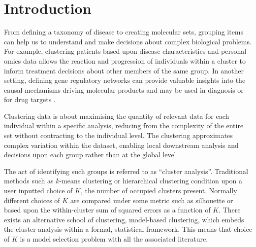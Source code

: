 \documentclass{bioinfo}
\begin{document}
\section{Introduction}

From defining a taxonomy of disease to creating molecular sets, grouping items can help us to understand and make decisions about complex biological problems. For example, clustering patients based upon disease characteristics and personal omics data allows the reaction and progression of individuals within a cluster to inform treatment decisions about other members of the same group. In another setting, defining gene regulatory networks can provide valuable insights into the causal mechanisms driving molecular products and may be used in diagnosis or for drug targets \citep{emmert2014gene}. 

Clustering data is about maximising the quantity of relevant data for each individual within a specific analysis, reducing from the complexity of the entire set without contracting to the individual level. The clustering approximates complex variation within the dataset, enabling local downstream analysis and decisions upon each group rather than at the global level. 

The act of identifying such groups is referred to as “cluster analysis”. Traditional methods such as $k$-means clustering \citep{lloyd1982least, forgy1965cluster} or hierarchical clustering condition upon a user inputted choice of $K$, the number of occupied clusters present. Normally different choices of $K$ are compared under some metric such as silhouette or based upon the within-cluster sum of squared errors as a function of $K$. There exists an alternative school of clustering, model-based clustering, which embeds the cluster analysis within a formal, statistical framework. This means that choice of $K$ is a model selection problem with all the associated literature. 
\end{document}
